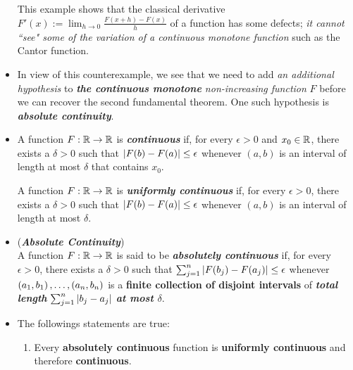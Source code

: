 \documentclass[11pt]{article}
\begin{document}
\begin{itemize}
\begin{remark}
This example shows that the classical derivative $F'(x) := \lim_{h\rightarrow 0}\frac{F(x+h)−F (x)}{h}$ of a function has some defects; \emph{it
cannot ``see" some of the variation of a continuous monotone function} such as the Cantor function.
\end{remark}

\item \begin{remark}
In view of this counterexample, we see that we need to add \emph{an additional hypothesis} to \emph{\textbf{the continuous monotone} non-increasing function} $F$ before we can recover the second fundamental theorem. One such hypothesis is \emph{\textbf{absolute continuity}}.
\end{remark}


\item \begin{definition}
A function $F : {\mathbb R} \rightarrow {\mathbb R}$ is \emph{\textbf{continuous}} if, for every $\epsilon > 0$ and $x_0 \in {\mathbb R}$, there exists a $\delta > 0$ such that $\left\lvert F(b) - F (a) \right\rvert \le \epsilon$ whenever $(a, b)$ is an interval of length at most $\delta$ that contains $x_0$.
\end{definition}

\begin{definition}
A function $F : {\mathbb R} \rightarrow {\mathbb R}$ is \emph{\textbf{uniformly continuous}} if, for every $\epsilon > 0$, there exists a $\delta > 0$ such that $\left\lvert F(b) - F (a) \right\rvert \le \epsilon$ whenever $(a, b)$  is an interval of length at most $\delta$.
\end{definition}

\item \begin{definition} (\textbf{\emph{Absolute Continuity}})\\
A function $F : {\mathbb R} \rightarrow {\mathbb R}$ is said to be \textbf{\emph{absolutely continuous}} if, for every $\epsilon > 0$, there exists a $\delta > 0$ such that $\sum_{j=1}^{n}\left\lvert F(b_j) - F(a_j) \right\rvert \le \epsilon$ whenever $(a_1, b_1) \,{,}\ldots{,}\, (a_n, b_n)$ is a \textbf{finite collection of disjoint intervals} of \emph{\textbf{total length}} $\sum_{j=1}^{n}\left\lvert b_j - a_j \right\rvert$ \emph{\textbf{at most $\delta$}}.
\end{definition}

\item \begin{proposition} The followings statements are true:
\begin{enumerate}
\item Every \textbf{absolutely continuous} function is \textbf{uniformly continuous} and therefore \textbf{continuous}.


\end{enumerate}
\end{proposition}
\end{itemize}
\end{document}
